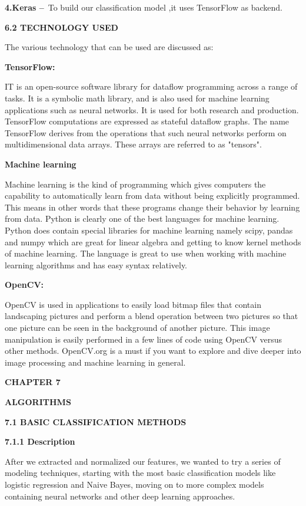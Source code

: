 \documentclass[a4paper,12pt]{article}
\begin{document}
\textbf{4.Keras --}~To build our classification model ,it uses
TensorFlow as backend.

\textbf{6.2 TECHNOLOGY USED}

The various technology that can be used are discussed as:

\textbf{TensorFlow:}

IT is an open-source software library for dataflow programming across a
range of tasks. It is a symbolic math library, and is also used for
machine learning applications such as neural networks. It is used for
both research and production. TensorFlow computations are expressed as
stateful dataflow graphs. The name TensorFlow derives from the
operations that such neural networks perform on multidimensional data
arrays. These arrays are referred to as "tensors".

\textbf{Machine learning}

Machine learning is the kind of programming which gives computers the
capability to automatically learn from data without being explicitly
programmed. This means in other words that these programs change their
behavior by learning from data. Python is clearly one of the best
languages for machine learning. Python does contain special libraries
for machine learning namely scipy, pandas and numpy which are great for
linear algebra and getting to know kernel methods of machine learning.
The language is great to use when working with machine learning
algorithms and has easy syntax relatively.

\textbf{OpenCV:}

OpenCV is used in applications to easily load bitmap files that contain
landscaping pictures and perform a blend operation between two pictures
so that one picture can be seen in the background of another picture.
This image manipulation is easily performed in a few lines of code using
OpenCV versus other methods. OpenCV.org is a must if you want to explore
and dive deeper into image processing and machine learning in general.

\textbf{CHAPTER 7}

\textbf{ALGORITHMS}

\textbf{7.1 BASIC CLASSIFICATION METHODS}

\textbf{7.1.1 Description}

After we extracted and normalized our features, we wanted to try a
series of modeling techniques, starting with the most basic
classification models like logistic regression and Naive Bayes, moving
on to more complex models containing neural networks and other deep
learning approaches.
\end{document}
